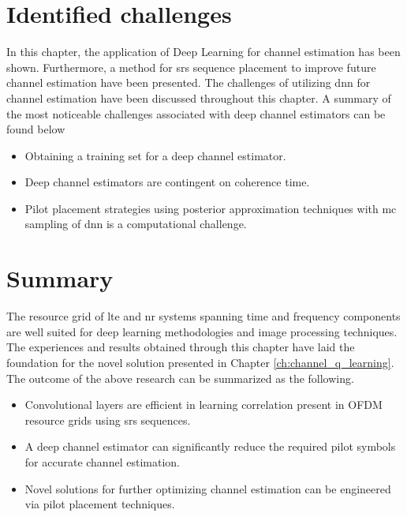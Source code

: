\section{Identified challenges}\label{sec:channel_estimation_challenges}
In this chapter, the application of Deep Learning for channel estimation has been shown. Furthermore, a method for \gls{srs} sequence placement to improve future channel estimation have been presented. The challenges of utilizing \gls{dnn} for channel estimation have been discussed throughout this chapter. A summary of the most noticeable challenges associated with deep channel estimators can be found below
\begin{itemize}
    \item Obtaining a training set for a deep channel estimator.
    \item Deep channel estimators are contingent on coherence time.
    \item Pilot placement strategies using posterior approximation techniques with \gls{mc} sampling of \gls{dnn} is a computational challenge.
\end{itemize}

\section{Summary}
The resource grid of \gls{lte} and \gls{nr} systems spanning time and frequency components are well suited for deep learning methodologies and image processing techniques. The experiences and results obtained through this chapter have laid the foundation for the novel solution presented in  Chapter \ref{ch:channel_q_learning}. The outcome of the above research can be summarized as the following.

\begin{itemize}
    \item Convolutional layers are efficient in learning correlation present in OFDM resource grids using \gls{srs} sequences.
    \item A deep channel estimator can significantly reduce the required pilot symbols for accurate channel estimation.
    \item Novel solutions for further optimizing channel estimation can be engineered via pilot placement techniques. 
\end{itemize}